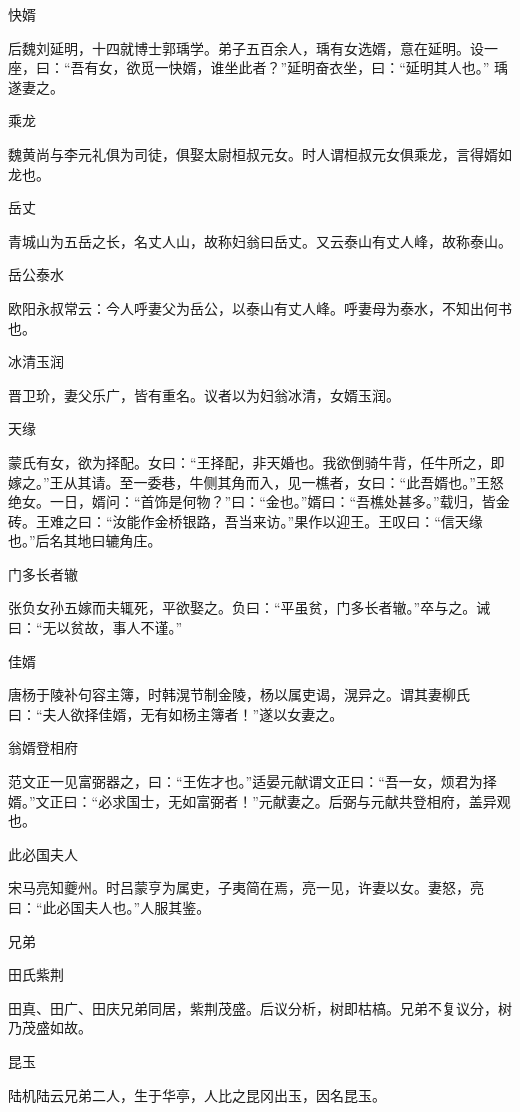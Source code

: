 \documentclass[a4paper,12pt,UTF8,twoside]{ctexbook}
\begin{document}
    快婿
    
    后魏刘延明，十四就博士郭瑀学。弟子五百余人，瑀有女选婿，意在延明。设一座，曰：“吾有女，欲觅一快婿，谁坐此者？”延明奋衣坐，曰：“延明其人也。” 瑀遂妻之。
    
    乘龙
    
    魏黄尚与李元礼俱为司徒，俱娶太尉桓叔元女。时人谓桓叔元女俱乘龙，言得婿如龙也。
    
    岳丈
    
    青城山为五岳之长，名丈人山，故称妇翁曰岳丈。又云泰山有丈人峰，故称泰山。
    
    岳公泰水
    
    欧阳永叔常云：今人呼妻父为岳公，以泰山有丈人峰。呼妻母为泰水，不知出何书也。
    
    冰清玉润
    
    晋卫玠，妻父乐广，皆有重名。议者以为妇翁冰清，女婿玉润。
    
    天缘
    
    蒙氏有女，欲为择配。女曰：“王择配，非天婚也。我欲倒骑牛背，任牛所之，即嫁之。”王从其请。至一委巷，牛侧其角而入，见一樵者，女曰：“此吾婿也。”王怒绝女。一日，婿问：“首饰是何物？”曰：“金也。”婿曰：“吾樵处甚多。”载归，皆金砖。王难之曰：“汝能作金桥银路，吾当来访。”果作以迎王。王叹曰：“信天缘也。”后名其地曰辘角庄。
    
    门多长者辙
    
    张负女孙五嫁而夫辄死，平欲娶之。负曰：“平虽贫，门多长者辙。”卒与之。诫曰：“无以贫故，事人不谨。”
    
    佳婿
    
    唐杨于陵补句容主簿，时韩滉节制金陵，杨以属吏谒，滉异之。谓其妻柳氏曰：“夫人欲择佳婿，无有如杨主簿者！”遂以女妻之。
    
    翁婿登相府
    
    范文正一见富弼器之，曰：“王佐才也。”适晏元献谓文正曰：“吾一女，烦君为择婿。”文正曰：“必求国士，无如富弼者！”元献妻之。后弼与元献共登相府，盖异观也。
    
    此必国夫人
    
    宋马亮知夔州。时吕蒙亨为属吏，子夷简在焉，亮一见，许妻以女。妻怒，亮曰：“此必国夫人也。”人服其鉴。
    
    兄弟
    
    田氏紫荆
    
    田真、田广、田庆兄弟同居，紫荆茂盛。后议分析，树即枯槁。兄弟不复议分，树乃茂盛如故。
    
    昆玉
    
    陆机陆云兄弟二人，生于华亭，人比之昆冈出玉，因名昆玉。
    
\end{document}
